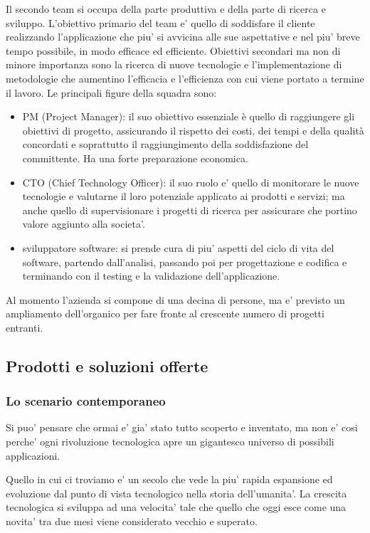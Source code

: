 Il secondo team si occupa della parte produttiva e della parte di ricerca e sviluppo. L'obiettivo primario del team e' quello di soddisfare il cliente realizzando l'applicazione che piu' si avvicina alle sue aspettative e nel piu' breve tempo possibile, in modo efficace ed efficiente. Obiettivi secondari ma non di minore importanza sono la ricerca di nuove tecnologie e l'implementazione di metodologie che aumentino l'efficacia e l'efficienza con cui viene portato a termine il lavoro.
Le principali figure della squadra sono:
\begin{itemize}
	\item PM (Project Manager): il suo obiettivo essenziale è quello di raggiungere gli obiettivi di progetto, assicurando il rispetto dei costi, dei tempi e della qualità concordati e soprattutto il raggiungimento della soddisfazione del committente. Ha una forte preparazione economica.
	\item CTO (Chief Technology Officer): il suo ruolo e' quello di monitorare le nuove tecnologie e valutarne il loro potenziale applicato ai prodotti e servizi; ma anche quello di supervisionare i progetti di ricerca per assicurare che portino valore aggiunto alla societa'.
	\item sviluppatore software:  si prende cura di piu' aspetti del ciclo di vita del software, partendo dall'analisi, passando poi per progettazione e codifica e terminando con il testing e la validazione dell'applicazione. 
\end{itemize} 

Al momento l'azienda si compone di una decina di persone, ma e' previsto un ampliamento dell'organico per fare fronte al crescente numero di progetti entranti.

\subsection{Prodotti e soluzioni offerte}
\subsubsection{Lo scenario contemporaneo}
Si puo' pensare che ormai e' gia' stato tutto scoperto e inventato, ma non e' cosi perche' ogni rivoluzione tecnologica apre un gigantesco universo di possibili applicazioni. 

Quello in cui ci troviamo e' un secolo che vede la piu' rapida espansione ed evoluzione dal punto di vista tecnologico nella storia dell'umanita'. La crescita tecnologica si sviluppa ad una velocita' tale che quello che oggi esce come una novita' tra due mesi viene considerato vecchio e superato.

